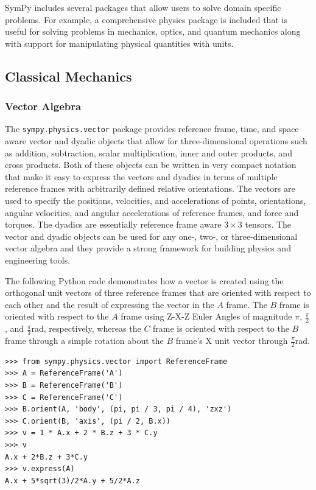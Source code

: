 SymPy includes several packages that allow users to solve domain specific
problems. For example, a comprehensive physics package is included that is
useful for solving problems in mechanics, optics, and quantum
mechanics along with support for manipulating physical quantities with units.


\subsection{Classical Mechanics}

\subsubsection{Vector Algebra}

The \verb|sympy.physics.vector| package provides reference frame, time, and
space aware vector and dyadic objects that allow for three-dimensional
operations such as addition, subtraction, scalar multiplication, inner and
outer products, and cross products. Both of these objects can be written in
very compact notation that make it easy to express the vectors and dyadics in
terms of multiple reference frames with arbitrarily defined relative
orientations. The vectors are used to specify the positions, velocities, and
accelerations of points, orientations, angular velocities, and angular
accelerations of reference frames, and force and torques. The dyadics are
essentially reference frame aware $3 \times 3$ tensors. The vector and dyadic
objects can be used for any one-, two-, or three-dimensional vector algebra and
they provide a strong framework for building physics and engineering tools.

The following Python code demonstrates how a vector is created using
the orthogonal unit vectors of three reference frames that are oriented with
respect to each other and the result of expressing the vector in the $A$
frame. The $B$ frame is oriented with respect to the $A$ frame using Z-X-Z
Euler Angles of magnitude $\pi$, $\frac{\pi}{2}$, and
$\frac{\pi}{3}$\si{\radian}, respectively, whereas the $C$ frame is oriented
with respect to the $B$ frame through a simple rotation about the $B$ frame's
X unit vector through $\frac{\pi}{2}$\si{\radian}.

\begin{verbatim}
>>> from sympy.physics.vector import ReferenceFrame
>>> A = ReferenceFrame('A')
>>> B = ReferenceFrame('B')
>>> C = ReferenceFrame('C')
>>> B.orient(A, 'body', (pi, pi / 3, pi / 4), 'zxz')
>>> C.orient(B, 'axis', (pi / 2, B.x))
>>> v = 1 * A.x + 2 * B.z + 3 * C.y
>>> v
A.x + 2*B.z + 3*C.y
>>> v.express(A)
A.x + 5*sqrt(3)/2*A.y + 5/2*A.z
\end{verbatim}

